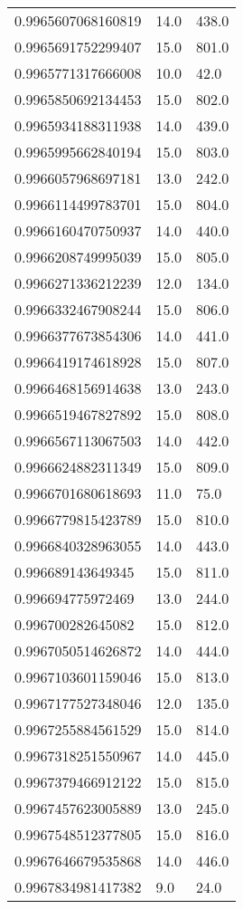\begin{center}
\begin{supertabular}[H]{p{0.30\textwidth}p{0.05\textwidth}p{0.05\textwidth}}
0.9965607068160819 & 14.0 & 438.0 \\ 
0.9965691752299407 & 15.0 & 801.0 \\ 
0.9965771317666008 & 10.0 & 42.0 \\ 
0.9965850692134453 & 15.0 & 802.0 \\ 
0.9965934188311938 & 14.0 & 439.0 \\ 
0.9965995662840194 & 15.0 & 803.0 \\ 
0.9966057968697181 & 13.0 & 242.0 \\ 
0.9966114499783701 & 15.0 & 804.0 \\ 
0.9966160470750937 & 14.0 & 440.0 \\ 
0.9966208749995039 & 15.0 & 805.0 \\ 
0.9966271336212239 & 12.0 & 134.0 \\ 
0.9966332467908244 & 15.0 & 806.0 \\ 
0.9966377673854306 & 14.0 & 441.0 \\ 
0.9966419174618928 & 15.0 & 807.0 \\ 
0.9966468156914638 & 13.0 & 243.0 \\ 
0.9966519467827892 & 15.0 & 808.0 \\ 
0.9966567113067503 & 14.0 & 442.0 \\ 
0.9966624882311349 & 15.0 & 809.0 \\ 
0.9966701680618693 & 11.0 & 75.0 \\ 
0.9966779815423789 & 15.0 & 810.0 \\ 
0.9966840328963055 & 14.0 & 443.0 \\ 
0.996689143649345 & 15.0 & 811.0 \\ 
0.996694775972469 & 13.0 & 244.0 \\ 
0.996700282645082 & 15.0 & 812.0 \\ 
0.9967050514626872 & 14.0 & 444.0 \\ 
0.9967103601159046 & 15.0 & 813.0 \\ 
0.9967177527348046 & 12.0 & 135.0 \\ 
0.9967255884561529 & 15.0 & 814.0 \\ 
0.9967318251550967 & 14.0 & 445.0 \\ 
0.9967379466912122 & 15.0 & 815.0 \\ 
0.9967457623005889 & 13.0 & 245.0 \\ 
0.9967548512377805 & 15.0 & 816.0 \\ 
0.9967646679535868 & 14.0 & 446.0 \\ 
0.9967834981417382 & 9.0 & 24.0 \\ 

\end{supertabular}
\end{center}
